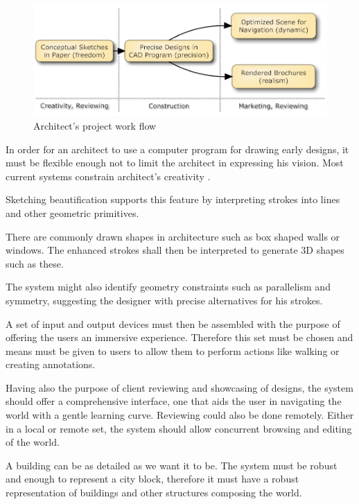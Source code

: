 \begin{figure}[!ht]
	\centering
	\includegraphics[width=12cm]{gfx/workflow1.png}
	\caption{Architect's project work flow}
	\label{FIG-WORKFLOW1}
\end{figure}

In order for an architect to use a computer program for drawing early designs,
it must be flexible enough not to limit the architect in expressing his vision.
Most current systems constrain architect's creativity \cite{TOW3D}.

Sketching beautification supports this feature by interpreting strokes
into lines and other geometric primitives.

There are commonly drawn shapes in architecture such as box shaped walls or windows.
The enhanced strokes shall then be interpreted to generate 3D shapes such as these.

The system might also identify geometry constraints such as parallelism and symmetry,
suggesting the designer with precise alternatives for his strokes.

A set of input and output devices must then be assembled with the purpose of offering
the users an immersive experience. Therefore this set must be chosen and
means must be given to users to allow them to perform actions like walking or creating
annotations.

Having also the purpose of client reviewing and showcasing of designs,
the system should offer a comprehensive interface,
one that aids the user in navigating the world with a gentle learning curve.
Reviewing could also be done remotely.
Either in a local or remote set, the system should allow
concurrent browsing and editing of the world.

A building can be as detailed as we want it to be.
The system must be robust and enough to represent a city block, therefore it must have a
robust representation of buildings and other structures composing the world.

